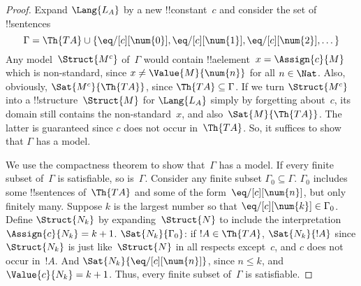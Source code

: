\documentclass[../../../include/open-logic-section]{subfiles}
\begin{document}
\begin{proof}
Expand $\Lang{L_A}$ by a new !!{constant}~$c$ and consider the set of
!!{sentence}s
\[
\Gamma = \Th{TA} \cup \{\eq/[c][\num{0}], \eq/[c][\num{1}],
\eq/[c][\num{2}], \dots\}
\]
Any model~$\Struct{M^c}$ of~$\Gamma$ would contain !!a{element}~$x =
\Assign{c}{M}$ which is non-standard, since $x \neq
\Value{M}{\num{n}}$ for all $n \in \Nat$. Also, obviously,
$\Sat{M^c}{\Th{TA}}$, since $\Th{TA} \subseteq \Gamma$. If we turn
$\Struct{M^c}$ into a !!{structure}~$\Struct{M}$ for $\Lang{L_A}$
simply by forgetting about~$c$, its domain still contains the
non-standard~$x$, and also~$\Sat{M}{\Th{TA}}$. The latter is
guaranteed since $c$ does not occur in~$\Th{TA}$. So, it suffices to
show that $\Gamma$ has a model.

We use the compactness theorem to show that~$\Gamma$ has a model. If
every finite subset of~$\Gamma$ is satisfiable, so
is~$\Gamma$. Consider any finite subset $\Gamma_0 \subseteq
\Gamma$. $\Gamma_0$ includes some !!{sentence}s of~$\Th{TA}$ and some
of the form~$\eq/[c][\num{n}]$, but only finitely many. Suppose $k$ is
the largest number so that $\eq/[c][\num{k}] \in \Gamma_0$. Define
$\Struct{N_k}$ by expanding~$\Struct{N}$ to include the
interpretation~$\Assign{c}{N_k} = k+1$. $\Sat{N_k}{\Gamma_0}$: if $!A
\in \Th{TA}$, $\Sat{N_k}{!A}$ since $\Struct{N_k}$ is just
like~$\Struct{N}$ in all respects except~$c$, and $c$ does not occur
in~$!A$. And $\Sat{N_k}{\eq/[c][\num{n}]}$, since $n \le k$, and
$\Value{c}{N_k} = k+1$. Thus, every finite subset of~$\Gamma$ is
satisfiable.
\end{proof}
\end{document}
